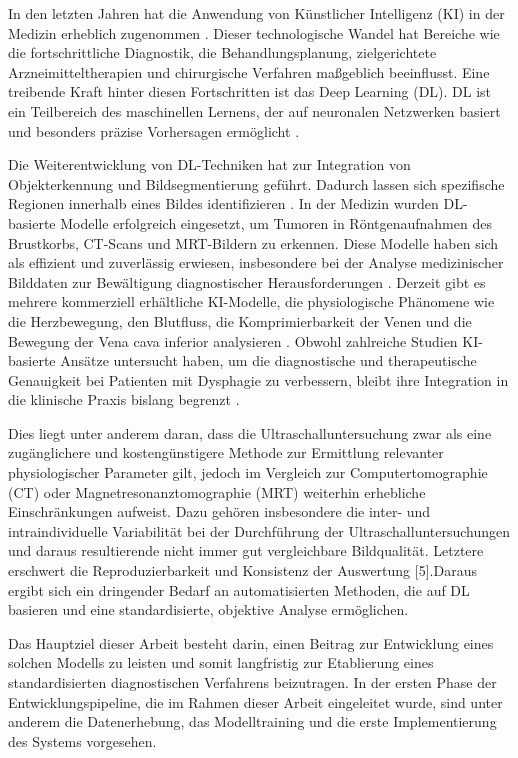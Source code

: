 \documentclass[
	german,
	accentcolor=10c,%
	type=intern,
	marginpar=false
	]{tudapub}
\begin{document}
In den letzten Jahren hat die Anwendung von Künstlicher Intelligenz (KI) in der Medizin erheblich zugenommen \cite{ref3}. Dieser technologische Wandel hat Bereiche wie die fortschrittliche Diagnostik, die Behandlungsplanung, zielgerichtete Arzneimitteltherapien und chirurgische Verfahren maßgeblich beeinflusst. Eine treibende Kraft hinter diesen Fortschritten ist das Deep Learning (DL). DL ist ein Teilbereich des maschinellen Lernens, der auf neuronalen Netzwerken basiert und besonders präzise Vorhersagen ermöglicht \cite{ref4}.

Die Weiterentwicklung von DL-Techniken hat zur Integration von Objekterkennung und Bildsegmentierung geführt. Dadurch lassen sich spezifische Regionen innerhalb eines Bildes identifizieren \cite{ref3,ref4}. In der Medizin wurden DL-basierte Modelle erfolgreich eingesetzt, um Tumoren in Röntgenaufnahmen des Brustkorbs, CT-Scans und MRT-Bildern zu erkennen. Diese Modelle haben sich als effizient und zuverlässig erwiesen, insbesondere bei der Analyse medizinischer Bilddaten zur Bewältigung diagnostischer Herausforderungen \cite{ref3}.
Derzeit gibt es mehrere kommerziell erhältliche KI-Modelle, die physiologische Phänomene wie die Herzbewegung, den Blutfluss, die Komprimierbarkeit der Venen und die Bewegung der Vena cava inferior analysieren \cite{ref3,ref4}. Obwohl zahlreiche Studien KI-basierte Ansätze untersucht haben, um die diagnostische und therapeutische Genauigkeit bei Patienten mit Dysphagie zu verbessern, bleibt ihre Integration in die klinische Praxis bislang begrenzt \cite{ref4}.

Dies liegt unter anderem daran, dass die Ultraschalluntersuchung zwar als eine zugänglichere und kostengünstigere Methode zur Ermittlung relevanter physiologischer Parameter gilt, jedoch im Vergleich zur Computertomographie (CT) oder Magnetresonanztomographie (MRT) weiterhin erhebliche Einschränkungen aufweist. Dazu gehören insbesondere die inter- und intraindividuelle Variabilität bei der Durchführung der Ultraschalluntersuchungen und daraus resultierende nicht immer gut vergleichbare Bildqualität. Letztere erschwert die Reproduzierbarkeit und Konsistenz der Auswertung [5].Daraus ergibt sich ein dringender Bedarf an automatisierten Methoden, die auf DL basieren und eine standardisierte, objektive Analyse ermöglichen.

Das Hauptziel dieser Arbeit besteht darin, einen Beitrag zur Entwicklung eines solchen Modells zu leisten und somit langfristig zur Etablierung eines standardisierten diagnostischen Verfahrens beizutragen. In der ersten Phase der Entwicklungspipeline, die im Rahmen dieser Arbeit eingeleitet wurde, sind unter anderem die Datenerhebung, das Modelltraining und die erste Implementierung des Systems vorgesehen.
\end{document}
